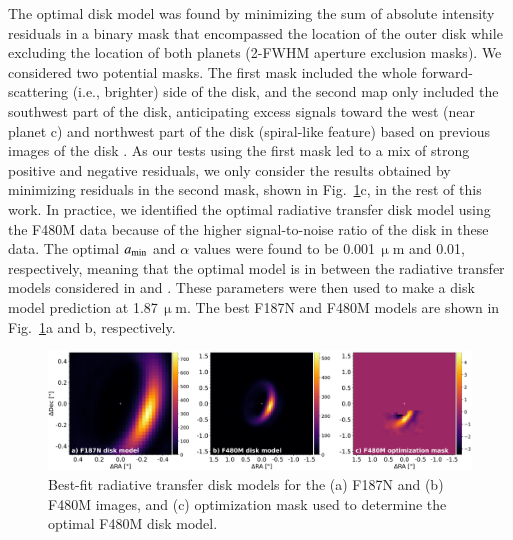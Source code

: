 \documentclass[longauth]{aa}
\newcommand{\vc}[1]{#1}
\begin{document}
\begin{appendix}
The optimal disk model was found by minimizing the sum of absolute intensity residuals in a binary mask that encompassed the location of the outer disk while excluding the location of both planets (2-FWHM aperture exclusion masks).  
We considered two potential masks. The first mask included the whole forward-scattering (i.e., brighter) side of the disk, and the second map only included the southwest part of the disk, anticipating excess signals toward the west (near planet c) and northwest part of the disk (spiral-like feature) based on previous images of the disk \citep[][]{Wang2020, Juillard2022}. As our tests using the first mask led to a mix of strong positive and negative residuals, we only consider the results obtained by minimizing residuals in the second mask, shown in Fig.~\ref{fig:disk_models}c, in the rest of this work. 
    In practice, we identified the optimal radiative transfer disk model using the F480M data because of the higher signal-to-noise ratio of the disk in these data. The optimal $a_{\rm min}$ and $\alpha$ values were found to be 0.001\,$\upmu$m and 0.01, respectively, meaning that the optimal \vc{model} is in between the radiative transfer models considered in \citet{Portilla-Revelo2022} and \citet{Portilla-Revelo2023}. 
    These parameters were then used to make a disk model prediction at 1.87\,$\upmu$m. %
    The best F187N and F480M models are shown in Fig.~\ref{fig:disk_models}a and b, respectively. %
    

    \begin{figure}[!t]
    \centering
    \includegraphics[width=\textwidth]{FigB2.pdf}
    \caption{Best-fit radiative transfer disk models for the (a) F187N and (b) F480M images, and (c) optimization mask used to determine the optimal F480M disk model. %
    }
    \label{fig:disk_models}
    \end{figure}


\end{appendix}
\end{document}
